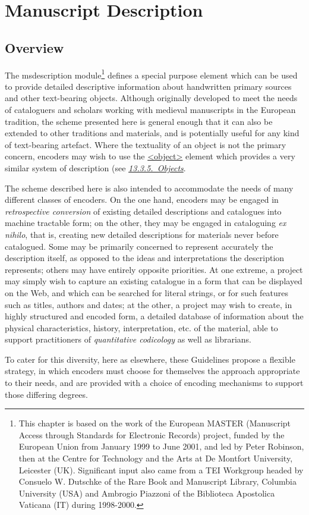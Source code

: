 
\section[{Manuscript Description}]{Manuscript Description}\label{MS}
\subsection[{Overview}]{Overview}\label{msov}\par
The \textsf{msdescription} module\footnote{This chapter is based on the work of the European MASTER (Manuscript Access through Standards for Electronic Records) project, funded by the European Union from January 1999 to June 2001, and led by Peter Robinson, then at the Centre for Technology and the Arts at De Montfort University, Leicester (UK). Significant input also came from a TEI Workgroup headed by Consuelo W. Dutschke of the Rare Book and Manuscript Library, Columbia University (USA) and Ambrogio Piazzoni of the Biblioteca Apostolica Vaticana (IT) during 1998-2000.} defines a special purpose element which can be used to provide detailed descriptive information about handwritten primary sources and other text-bearing objects. Although originally developed to meet the needs of cataloguers and scholars working with medieval manuscripts in the European tradition, the scheme presented here is general enough that it can also be extended to other traditions and materials, and is potentially useful for any kind of text-bearing artefact. Where the textuality of an object is not the primary concern, encoders may wish to use the \hyperref[TEI.object]{<object>} element which provides a very similar system of description (see \textit{\hyperref[NDOBJ]{13.3.5.\ Objects}}.\par
The scheme described here is also intended to accommodate the needs of many different classes of encoders. On the one hand, encoders may be engaged in \textit{retrospective conversion} of existing detailed descriptions and catalogues into machine tractable form; on the other, they may be engaged in cataloguing \textit{ex nihilo}, that is, creating new detailed descriptions for materials never before catalogued. Some may be primarily concerned to represent accurately the description itself, as opposed to the ideas and interpretations the description represents; others may have entirely opposite priorities. At one extreme, a project may simply wish to capture an existing catalogue in a form that can be displayed on the Web, and which can be searched for literal strings, or for such features such as titles, authors and dates; at the other, a project may wish to create, in highly structured and encoded form, a detailed database of information about the physical characteristics, history, interpretation, etc. of the material, able to support practitioners of \textit{quantitative codicology} as well as librarians.\par
To cater for this diversity, here as elsewhere, these Guidelines propose a flexible strategy, in which encoders must choose for themselves the approach appropriate to their needs, and are provided with a choice of encoding mechanisms to support those differing degrees.
